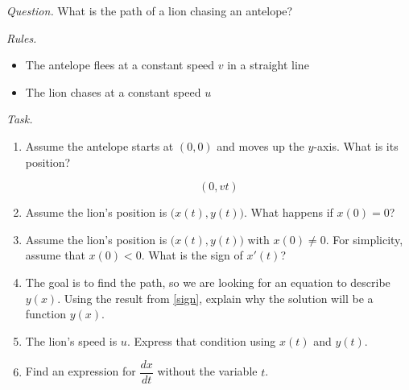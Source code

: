 \emph{Question.} 
What is the path of a lion chasing an antelope?

\vfill

\begin{graybox}
\emph{Rules. } 
\begin{itemize}
\item The antelope flees at a constant speed $v$ in a straight line
\item The lion chases at a constant speed $u$
\end{itemize}
\end{graybox}



\vfill

\emph{Task.}
\begin{enumerate}[label=\emph{\arabic*.}]

\item Assume the antelope starts at $(0,0)$ and moves up the $y$-axis. What is its position?

$$ (0,vt) $$

\item Assume the lion's position is $\big(x(t),y(t)\big)$. What happens if $x(0)=0$?
%    

\item \label{sign} Assume the lion's position is $\big(x(t),y(t)\big)$ with $x(0)\neq 0$. For simplicity, assume that $x(0)<0$. What is the sign of $x'(t)$?


\item \label{func} The goal is to find the path, so we are looking for an equation to describe $y(x)$. Using the result from \ref{sign}, explain why the solution will be a function $y(x)$.


\item \label{speed} The lion's speed is $u$. Express that condition using $x(t)$ and $y(t)$.


\item Find an expression for $\dfrac{dx}{dt}$ without the variable $t$. 
%    
%    


\end{enumerate}
